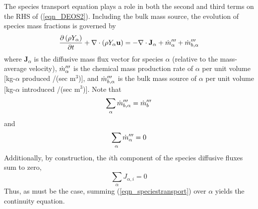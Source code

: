 The species transport equation plays a role in both the second and third terms on the RHS of (\ref{eqn_DEOS2}).  Including the bulk mass source, the evolution of species mass fractions is governed by
\begin{equation}
\label{eqn_speciestransport}
\frac{\partial \left(\rho Y_\alpha\right)}{\partial t} + \nabla\cdot \left(\rho Y_\alpha \mathbf{u}\right)  = - \nabla\cdot \mathbf{J}_{\alpha} + \dot{m}_\alpha^{{\prime\prime\prime}} + \dot{m}_{b,\alpha}^{{\prime\prime\prime}}
\end{equation}
where $\mathbf{J}_{\alpha}$ is the diffusive mass flux vector for species $\alpha$ (relative to the mass-average velocity),
$\dot{m}_\alpha^{{\prime\prime\prime}}$ is the chemical mass production rate of $\alpha$ per unit volume [kg-$\alpha$ produced /(sec m$^3$)],
and $\dot{m}_{b,\alpha}^{{\prime\prime\prime}}$ is the bulk mass source of $\alpha$ per unit volume [kg-$\alpha$ introduced /(sec m$^3$)].  Note that
\begin{equation}
\label{eqn_bulksum}
\sum_\alpha \dot{m}_{b,\alpha}^{{\prime\prime\prime}} = \dot{m}_b^{{\prime\prime\prime}}
\end{equation}
and
\begin{equation}
\label{eqn_massconservation}
\sum_\alpha \dot{m}_\alpha^{{\prime\prime\prime}} = 0
\end{equation}
Additionally, by construction, the $i$th component of the species diffusive fluxes sum to zero,
\begin{equation}
\label{eqn_sumdiffflux}
\sum_\alpha J_{\alpha,i} = 0
\end{equation}
Thus, as must be the case, summing (\ref{eqn_speciestransport}) over $\alpha$ yields the continuity equation.

